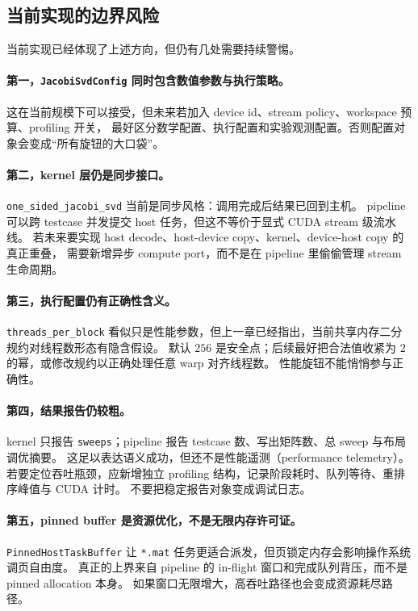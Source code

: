 \subsection{当前实现的边界风险}

当前实现已经体现了上述方向，但仍有几处需要持续警惕。

\paragraph{第一，\texttt{JacobiSvdConfig} 同时包含数值参数与执行策略。}
这在当前规模下可以接受，但未来若加入 device id、stream policy、workspace 预算、profiling 开关，
最好区分数学配置、执行配置和实验观测配置。否则配置对象会变成“所有旋钮的大口袋”。

\paragraph{第二，kernel 层仍是同步接口。}
\texttt{one\_sided\_jacobi\_svd} 当前是同步风格：调用完成后结果已回到主机。
pipeline 可以跨 testcase 并发提交 host 任务，但这不等价于显式 CUDA stream 级流水线。
若未来要实现 host decode、host-device copy、kernel、device-host copy 的真正重叠，
需要新增异步 compute port，而不是在 pipeline 里偷偷管理 stream 生命周期。

\paragraph{第三，执行配置仍有正确性含义。}
\texttt{threads\_per\_block} 看似只是性能参数，但上一章已经指出，当前共享内存二分规约对线程数形态有隐含假设。
默认 \(256\) 是安全点；后续最好把合法值收紧为 \(2\) 的幂，或修改规约以正确处理任意 warp 对齐线程数。
性能旋钮不能悄悄参与正确性。

\paragraph{第四，结果报告仍较粗。}
kernel 只报告 \texttt{sweeps}；pipeline 报告 testcase 数、写出矩阵数、总 sweep 与布局调优摘要。
这足以表达语义成功，但还不是性能遥测（performance telemetry）。
若要定位吞吐瓶颈，应新增独立 profiling 结构，记录阶段耗时、队列等待、重排序峰值与 CUDA 计时。
不要把稳定报告对象变成调试日志。

\paragraph{第五，pinned buffer 是资源优化，不是无限内存许可证。}
\texttt{PinnedHostTaskBuffer} 让 \texttt{*.mat} 任务更适合派发，但页锁定内存会影响操作系统调页自由度。
真正的上界来自 pipeline 的 in-flight 窗口和完成队列背压，而不是 pinned allocation 本身。
如果窗口无限增大，高吞吐路径也会变成资源耗尽路径。

